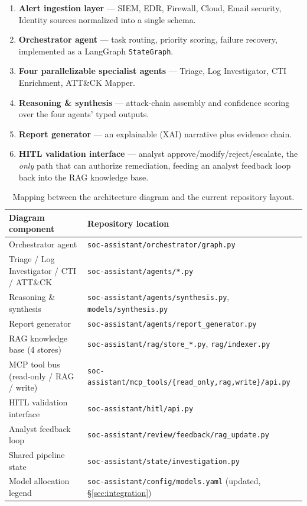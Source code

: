 \documentclass[11pt]{article}
\begin{document}
\begin{enumerate}[label=\arabic*.]
  \item \textbf{Alert ingestion layer} --- SIEM, EDR, Firewall, Cloud, Email security, Identity sources normalized into a single schema.
  \item \textbf{Orchestrator agent} --- task routing, priority scoring, failure recovery, implemented as a LangGraph \texttt{StateGraph}.
  \item \textbf{Four parallelizable specialist agents} --- Triage, Log Investigator, CTI Enrichment, ATT\&CK Mapper.
  \item \textbf{Reasoning \& synthesis} --- attack-chain assembly and confidence scoring over the four agents' typed outputs.
  \item \textbf{Report generator} --- an explainable (XAI) narrative plus evidence chain.
  \item \textbf{HITL validation interface} --- analyst approve/modify/reject/escalate, the \emph{only} path that can authorize remediation, feeding an analyst feedback loop back into the RAG knowledge base.
\end{enumerate}

\begin{table}[h]
\centering
\small
\begin{tabular}{@{}ll@{}}
\toprule
\textbf{Diagram component} & \textbf{Repository location} \\
\midrule
Orchestrator agent & \texttt{soc-assistant/orchestrator/graph.py} \\
Triage / Log Investigator / CTI / ATT\&CK & \texttt{soc-assistant/agents/*.py} \\
Reasoning \& synthesis & \texttt{soc-assistant/agents/synthesis.py}, \texttt{models/synthesis.py} \\
Report generator & \texttt{soc-assistant/agents/report\_generator.py} \\
RAG knowledge base (4 stores) & \texttt{soc-assistant/rag/store\_*.py}, \texttt{rag/indexer.py} \\
MCP tool bus (read-only / RAG / write) & \texttt{soc-assistant/mcp\_tools/\{read\_only,rag,write\}/api.py} \\
HITL validation interface & \texttt{soc-assistant/hitl/api.py} \\
Analyst feedback loop & \texttt{soc-assistant/review/feedback/rag\_update.py} \\
Shared pipeline state & \texttt{soc-assistant/state/investigation.py} \\
Model allocation legend & \texttt{soc-assistant/config/models.yaml} (updated, \S\ref{sec:integration}) \\
\bottomrule
\end{tabular}
\caption{Mapping between the architecture diagram and the current repository layout.}
\end{table}
\end{document}
